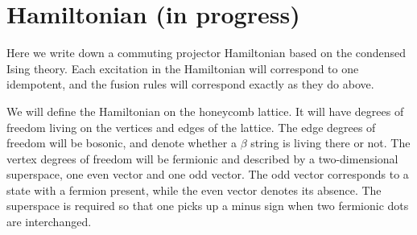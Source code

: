 \documentclass[12pt,a4paper]{article}
\newcommand{\cl}{\mathbb{C}\ell}
\newcommand{\remove}[1]{{\color{amber(sae/ece)}\footnotesize{(RM?) #1}}}
\newcommand{\ethan}[1]{{\color{amethyst}\footnotesize{(EL) #1}}}
\begin{document}
{{

\section{Hamiltonian (in progress)}
Here we write down a commuting projector Hamiltonian based on the condensed Ising theory. 
Each excitation in the Hamiltonian will correspond to one idempotent, and the fusion rules will correspond exactly as they do above. 

We will define the Hamiltonian on the honeycomb lattice. It will have degrees of freedom living on the vertices and edges of the lattice. 
The edge degrees of freedom will be bosonic, and denote whether a $\beta$ string is living there or not. 
The vertex degrees of freedom will be fermionic and described by a two-dimensional superspace, one even vector and one odd vector. 
The odd vector corresponds to a state with a fermion present, while the even vector denotes its absence. 
The superspace is required so that one picks up a minus sign when two fermionic dots are interchanged. 

}}
\end{document}

